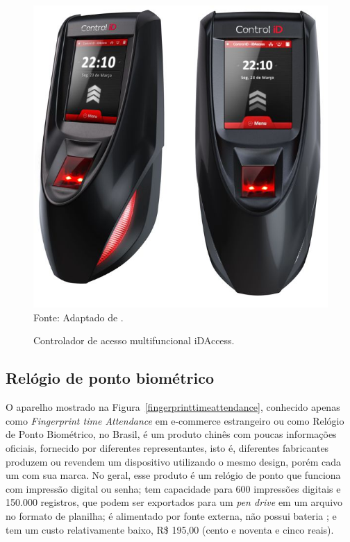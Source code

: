   \begin{figure}[!ht]
  \begin{center}
  \caption{Controlador de acesso multifuncional iDAccess.}
  \includegraphics[scale=0.4]{figuras/cap3/idaccess.jpg}\\
  Fonte: Adaptado de \cite{idaccess}.
  \label{idaccess}
  \end{center}
  \end{figure}


 \subsection{Relógio de ponto biométrico}

 O aparelho mostrado na Figura~\ref{fingerprinttimeattendance}, conhecido apenas como \textit{Fingerprint time Attendance} em e-commerce estrangeiro ou como Relógio de Ponto Biométrico, no Brasil, é um produto chinês com poucas informações oficiais, fornecido por diferentes representantes, isto é, diferentes fabricantes produzem ou revendem um dispositivo utilizando o mesmo design, porém cada um com sua marca. No geral, esse produto é um relógio de ponto que funciona com impressão digital ou senha; tem capacidade para 600 impressões digitais e 150.000 registros, que podem ser exportados para um \textit{pen drive} em um arquivo no formato de planilha; é alimentado por fonte externa, não possui bateria \cite{fingerprinttimeattendance}; e tem um custo relativamente baixo, R{\$} 195,00 (cento e noventa e cinco reais).

